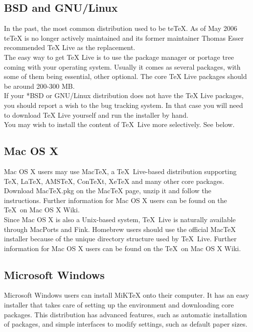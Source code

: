\documentclass[11pt]{article}
\begin{document}
\subsection{BSD and GNU/Linux}

In the past, the most common distribution used to be teTeX. As of May 2006 teTeX is no longer actively maintained and its former maintainer Thomas Esser recommended TeX Live as the replacement.\\

The easy way to get TeX Live is to use the package manager or portage tree coming with your operating system. Usually it comes as several packages, with some of them being essential, other optional. The core TeX Live packages should be around 200-300 MB.\\

If your *BSD or GNU/Linux distribution does not have the TeX Live packages, you should report a wish to the bug tracking system. In that case you will need to download TeX Live yourself and run the installer by hand.\\

You may wish to install the content of \TeX\ Live more selectively. See below.

\subsection{Mac OS X}

Mac OS X users may use MacTeX, a \TeX\ Live-based distribution supporting \TeX, LaTeX, AMSTeX, ConTeXt, XeTeX and many other core packages. Download MacTeX.pkg on the MacTeX page, unzip it and follow the instructions. Further information for Mac OS X users can be found on the \TeX\ on Mac OS X Wiki.\\

Since Mac OS X is also a Unix-based system, \TeX\ Live is naturally available through MacPorts and Fink. Homebrew users should use the official MacTeX installer because of the unique directory structure used by \TeX\ Live. Further information for Mac OS X users can be found on the \TeX\ on Mac OS X Wiki.


\subsection{Microsoft Windows}

Microsoft Windows users can install MiKTeX onto their computer. It has an easy installer that takes care of setting up the environment and downloading core packages. This distribution has advanced features, such as automatic installation of packages, and simple interfaces to modify settings, such as default paper sizes.\\
\end{document}

